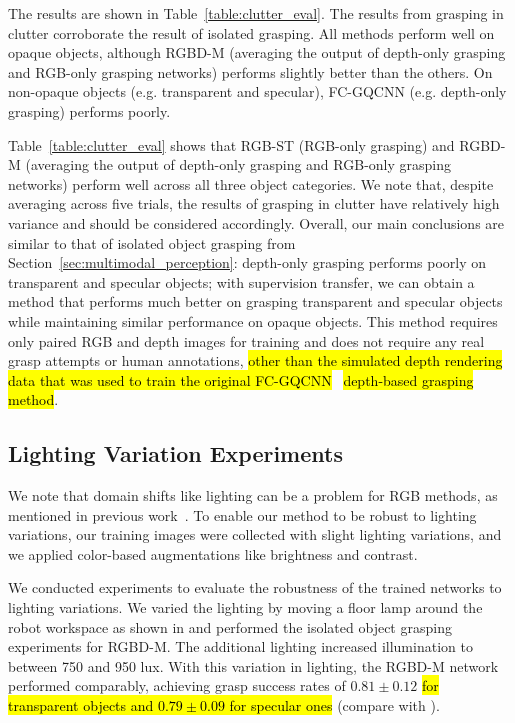 The results are shown in Table~\ref{table:clutter_eval}.
The results from grasping in clutter corroborate the result of isolated grasping. 
All methods perform well on opaque objects, although RGBD-M (averaging the output of depth-only grasping and RGB-only grasping networks) performs slightly better than the others.  On non-opaque objects (e.g. transparent and specular), FC-GQCNN (e.g. depth-only grasping) performs poorly.

Table~\ref{table:clutter_eval} shows that RGB-ST (RGB-only grasping) and RGBD-M (averaging the output of depth-only grasping and RGB-only grasping networks) perform well across all three object categories.  We note that, despite averaging across five trials, the results of grasping in clutter have relatively high variance and should be considered accordingly.  Overall, our main conclusions are similar to that of isolated object grasping from Section~\ref{sec:multimodal_perception}: depth-only grasping performs poorly on transparent and specular objects; with supervision transfer, we can obtain a method that performs much better on grasping transparent and specular objects while maintaining similar performance on opaque objects.
This method requires only paired RGB and depth images for training and does not require any real grasp attempts or human annotations, \hl{other than the simulated depth rendering data that was used to train the original FC-GQCNN}~\cite{satish2019policy} \hl{depth-based grasping method}.

\subsection{Lighting Variation Experiments}

We note that domain shifts like lighting can be a problem for RGB methods, as mentioned in previous work~\cite{mahler2018guest}. To enable our method to be robust to lighting variations, our training images were collected with slight lighting variations, and we applied color-based augmentations like brightness and contrast.

We conducted experiments to evaluate the robustness of the trained networks to lighting variations. We varied the lighting by moving a floor lamp around the robot workspace as shown in  and performed the isolated object grasping experiments for RGBD-M. The additional lighting increased illumination to between 750 and 950 lux. With this variation in lighting, the RGBD-M network performed comparably, achieving grasp success rates of $0.81\pm0.12$ \hl{for transparent objects and $0.79\pm0.09$ for specular ones} (compare with ).

